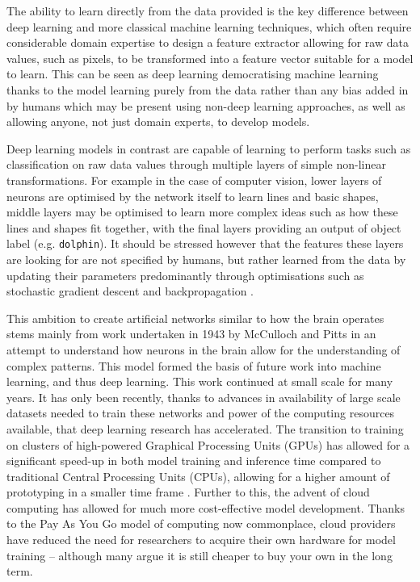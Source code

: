 The ability to learn directly from the data provided is the key difference between deep learning and more classical machine learning techniques, which often require considerable domain expertise to design a feature extractor allowing for raw data values, such as pixels, to be transformed into a feature vector suitable for a model to learn. This can be seen as deep learning democratising machine learning thanks to the model learning purely from the data rather than any bias added in by humans which may be present using non-deep learning approaches, as well as allowing anyone, not just domain experts, to develop models.

Deep learning models in contrast are capable of learning to perform tasks such as classification on raw data values through multiple layers of simple non-linear transformations. For example in the case of computer vision, lower layers of neurons are optimised by the network itself to learn lines and basic shapes, middle layers may be optimised to learn more complex ideas such as how these lines and shapes fit together, with the final layers providing an output of object label (e.g. \texttt{dolphin}). It should be stressed however that the features these layers are looking for are not specified by humans, but rather learned from the data by updating their parameters predominantly through optimisations such as stochastic gradient descent and backpropagation \cite{hecht-nielsen_iii.3_1992}.

This ambition to create artificial networks similar to how the brain operates stems mainly from work undertaken in 1943 by McCulloch and Pitts \cite{mcculloch_logical_1943} in an attempt to understand how neurons in the brain allow for the understanding of complex patterns. This model formed the basis of future work into machine learning, and thus deep learning. This work continued at small scale for many years. It has only been recently, thanks to advances in availability of large scale datasets needed to train these networks and power of the computing resources available, that deep learning research has accelerated. The transition to training on clusters of high-powered Graphical Processing Units (GPUs) has allowed for a significant speed-up in both model training and inference time compared to traditional Central Processing Units (CPUs), allowing for a higher amount of prototyping in a smaller time frame \cite{luo_artificial_2005}. Further to this, the advent of cloud computing has allowed for much more cost-effective model development. Thanks to the Pay As You Go model of computing now commonplace, cloud providers have reduced the need for researchers to acquire their own hardware for model training -- although many argue it is still cheaper to buy your own in the long term. 

